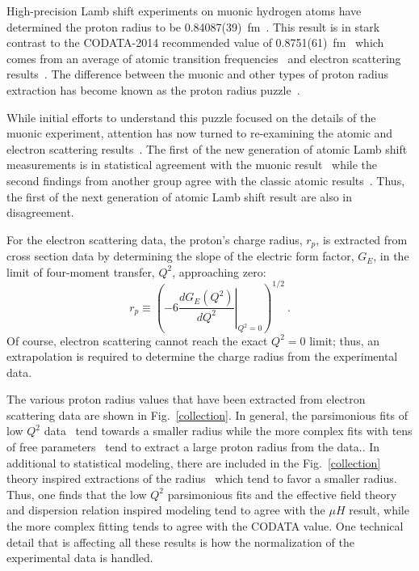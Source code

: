 \documentclass[10pt,aps,prc,twocolumn]{revtex4-1}
\begin{document}
High-precision Lamb shift experiments on muonic hydrogen atoms have determined the proton radius to 
be 0.84087(39)~fm~\cite{Pohl:2010zza,Antognini:1900ns}.   This result is in stark contrast to the
CODATA-2014 recommended value of 0.8751(61)~fm~\cite{Mohr:2015ccw} which comes from an average of atomic 
transition frequencies~\cite{Boshier:1989zz,Weitz:1994zz,Berkeland:1995dyd,Bourzeix:1996zz,Udem:1997zz} and electron scattering results~\cite{Mohr:2012tt,Arrington:2015ria}.    The difference between the muonic and other types of 
proton radius extraction has become known as the proton radius puzzle~\cite{Pohl:2013yb,Carlson:2015jba,Gao:2015aax,Pohl:2016tqq,Nez:2011zz}.

While initial efforts to understand this puzzle focused on the details of the muonic experiment, attention has
now turned to re-examining the atomic and electron scattering results~\cite{Kelkar:2016tcx}.   The first of the
new generation of atomic Lamb shift measurements is in statistical agreement with the muonic 
result~\cite{Beyer79} while the second findings from another group agree with the classic atomic 
results~\cite{fleurbaey:tel-01633631,Fleurbaey:2018}.   Thus, the first of the next generation of
atomic Lamb shift result are also in disagreement.

For the electron scattering data, the proton's charge radius, $r_p$, is extracted from
cross section data by determining the slope of the electric form factor, $G_E$, in the
limit of four-moment transfer, $Q^2$, approaching zero: 
\begin{equation}
\label{eq:radius}
  r_p \equiv %
    \left( -6  \left. \frac{dG_E(Q^2)}{dQ^2}
    \right|_{Q^{2}=0} \right)^{1/2} \>.
\end{equation}
Of course, electron scattering cannot reach the exact $Q^2 = 0$ limit; thus,
an extrapolation is required to determine the charge radius from the experimental data.

The various proton radius values that have been extracted from electron scattering data
are shown in Fig.~\ref{collection}.    
In general, the parsimonious fits of low $Q^2$ data~\cite{Rosenfelder:1999cd,Griffioen:2015hta,Horbatsch:2015qda,Higinbotham:2015rja}
tend towards a smaller radius while the more complex fits with tens of free 
parameters~\cite{Bernauer:2010wm,Bernauer:2013tpr,Lee:2015jqa,Graczyk:2014lba,Lorenz:2014vha} tend to extract a large
proton radius from the data..
In additional to statistical modeling, there are included in the Fig.~\ref{collection}
theory inspired extractions of the radius~\cite{Hohler:1976ax,Belushkin:2006qa,Horbatsch:2016ilr} which tend to
favor a smaller radius.
Thus, one finds that the low $Q^2$ parsimonious fits and the effective field theory and dispersion relation 
inspired modeling tend to agree with the $\mu H$ result, while the more complex fitting
tends to agree with the CODATA value.   One technical detail that is affecting all these results is how the normalization
of the experimental data is handled.
\end{document}
